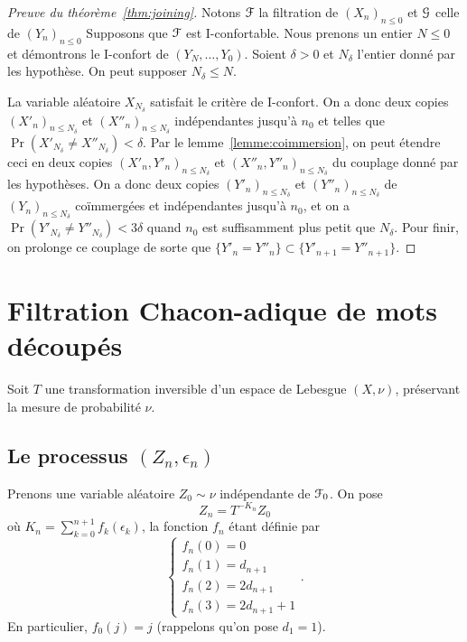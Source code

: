 \documentclass[12pt,a4paper]{article}
\begin{document}
\begin{proof}[Preuve du théorème~\ref{thm:joining}]
Notons $\EuScript{F}$ la filtration de  ${(X_n)}_{n \leq 0}$ et 
$\EuScript{G}$ celle de ${(Y_n)}_{n \leq 0}$
Supposons que $\EuScript{F}$ est I-confortable.
Nous prenons un entier $N \leq 0$ et démontrons le I-confort de 
$(Y_N, \ldots, Y_0)$.  
Soient $\delta >0$ et $N_\delta$ l'entier donné par les hypothèse. 
On peut supposer $N_\delta \leq N$. 

La variable aléatoire $X_{N_\delta}$ satisfait le critère de I-confort. 
On a donc deux copies ${(X'_n)}_{n \leq N_\delta}$ et ${(X''_n)}_{n \leq N_\delta}$ 
indépendantes jusqu'à $n_0$ et telles que $\Pr(X'_{N_\delta} \neq X''_{N_\delta}) < \delta$. 
Par le lemme~\ref{lemme:coimmersion}, on peut étendre ceci 
en deux copies  ${(X'_n, Y'_n)}_{n \leq N_\delta}$ et ${(X''_n, Y''_n)}_{n \leq N_\delta}$ 
du couplage donné par les hypothèses. 
On a donc  deux copies ${(Y'_n)}_{n \leq N_\delta}$ et ${(Y''_n)}_{n \leq N_\delta}$ 
de ${(Y_n)}_{n \leq N_\delta}$ coïmmergées et indépendantes jusqu'à $n_0$, 
et on a $\Pr(Y'_{N_\delta} \neq Y''_{N_\delta}) < 3\delta$ 
quand $n_0$ est suffisamment plus petit que $N_\delta$. 
Pour finir, on prolonge ce couplage de sorte que 
$\{Y'_n = Y''_n\} \subset \{Y'_{n+1} = Y''_{n+1}\}$.
\end{proof}
\section{Filtration Chacon-adique de mots découpés}

Soit $T$ une transformation inversible d'un espace de Lebesgue $(X,\nu)$, 
préservant la mesure de probabilité $\nu$. 

\subsection{Le processus $(Z_n,\epsilon_n)$}

Prenons une variable aléatoire $Z_0 \sim \nu$ indépendante de $\EuScript{F}_0$. 
On pose 
$$
Z_n = T^{-K_n}Z_0
$$
où $K_n=\sum_{k=0}^{n+1}f_k(\epsilon_k)$, la fonction $f_n$ étant définie par 
$$
\begin{cases}
f_n(0) = 0 \\ 
f_n(1) = d_{n+1} \\ 
f_n(2) = 2d_{n+1} \\
f_n(3) = 2 d_{n+1} + 1
\end{cases}.
$$
En particulier, $f_0(j)=j$ (rappelons qu'on pose $d_1=1$). 
\end{document}
